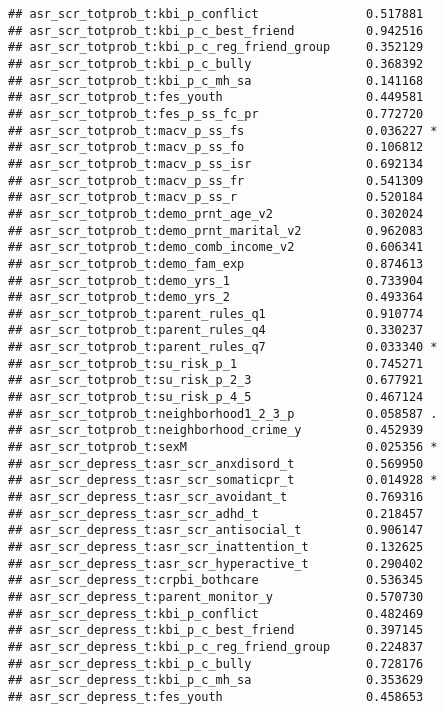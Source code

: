 \documentclass[
]{article}
\begin{document}
\begin{verbatim}
## asr_scr_totprob_t:kbi_p_conflict               0.517881    
## asr_scr_totprob_t:kbi_p_c_best_friend          0.942516    
## asr_scr_totprob_t:kbi_p_c_reg_friend_group     0.352129    
## asr_scr_totprob_t:kbi_p_c_bully                0.368392    
## asr_scr_totprob_t:kbi_p_c_mh_sa                0.141168    
## asr_scr_totprob_t:fes_youth                    0.449581    
## asr_scr_totprob_t:fes_p_ss_fc_pr               0.772720    
## asr_scr_totprob_t:macv_p_ss_fs                 0.036227 *  
## asr_scr_totprob_t:macv_p_ss_fo                 0.106812    
## asr_scr_totprob_t:macv_p_ss_isr                0.692134    
## asr_scr_totprob_t:macv_p_ss_fr                 0.541309    
## asr_scr_totprob_t:macv_p_ss_r                  0.520184    
## asr_scr_totprob_t:demo_prnt_age_v2             0.302024    
## asr_scr_totprob_t:demo_prnt_marital_v2         0.962083    
## asr_scr_totprob_t:demo_comb_income_v2          0.606341    
## asr_scr_totprob_t:demo_fam_exp                 0.874613    
## asr_scr_totprob_t:demo_yrs_1                   0.733904    
## asr_scr_totprob_t:demo_yrs_2                   0.493364    
## asr_scr_totprob_t:parent_rules_q1              0.910774    
## asr_scr_totprob_t:parent_rules_q4              0.330237    
## asr_scr_totprob_t:parent_rules_q7              0.033340 *  
## asr_scr_totprob_t:su_risk_p_1                  0.745271    
## asr_scr_totprob_t:su_risk_p_2_3                0.677921    
## asr_scr_totprob_t:su_risk_p_4_5                0.467124    
## asr_scr_totprob_t:neighborhood1_2_3_p          0.058587 .  
## asr_scr_totprob_t:neighborhood_crime_y         0.452939    
## asr_scr_totprob_t:sexM                         0.025356 *  
## asr_scr_depress_t:asr_scr_anxdisord_t          0.569950    
## asr_scr_depress_t:asr_scr_somaticpr_t          0.014928 *  
## asr_scr_depress_t:asr_scr_avoidant_t           0.769316    
## asr_scr_depress_t:asr_scr_adhd_t               0.218457    
## asr_scr_depress_t:asr_scr_antisocial_t         0.906147    
## asr_scr_depress_t:asr_scr_inattention_t        0.132625    
## asr_scr_depress_t:asr_scr_hyperactive_t        0.290402    
## asr_scr_depress_t:crpbi_bothcare               0.536345    
## asr_scr_depress_t:parent_monitor_y             0.570730    
## asr_scr_depress_t:kbi_p_conflict               0.482469    
## asr_scr_depress_t:kbi_p_c_best_friend          0.397145    
## asr_scr_depress_t:kbi_p_c_reg_friend_group     0.224837    
## asr_scr_depress_t:kbi_p_c_bully                0.728176    
## asr_scr_depress_t:kbi_p_c_mh_sa                0.353629    
## asr_scr_depress_t:fes_youth                    0.458653    

\end{verbatim}
\end{document}
